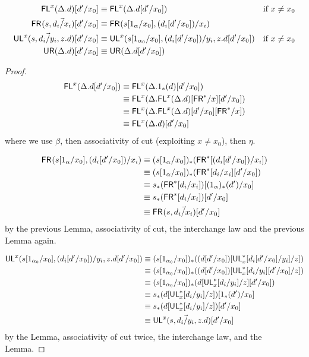 \begin{lemma}
\begin{align*}
\mathsf{FL}^{x}(\Delta.d)[d'/x_0] &\equiv \mathsf{FL}^{x}(\Delta.d[d'/x_0]) & \text{if } x \neq x_0 \\
\mathsf{FR}_{}(s,\vec{d_i/x_i})[d'/x_0] &\equiv \mathsf{FR}_{}(s[1_\alpha/x_0],(d_i[d'/x_0])/x_i) \\
\mathsf{UL}^{x}_{}(s,\vec{d_i/y_i},z.d)[d'/x_0] &\equiv \mathsf{UL}^{x}_{}(s[1_{\alpha_0}/x_0],(d_i[d'/x_0])/y_i,z.d[d'/x_0])  & \text{if } x \neq x_0 \\
\mathsf{UR}(\Delta.d)[d'/x_0] &\equiv \mathsf{UR}(\Delta.d[d'/x_0])
\end{align*}
\end{lemma}
\begin{proof}
\begin{align*}
\mathsf{FL}^{x}(\Delta.d[d'/x_0])
&\equiv \mathsf{FL}^{x}(\Delta.1_*(d)[d'/x_0]) \\
&\equiv \mathsf{FL}^{x}(\Delta.\mathsf{FL}^{x}(\Delta.d)[\mathsf{FR}^*/x][d'/x_0]) \\
&\equiv \mathsf{FL}^{x}(\Delta.\mathsf{FL}^{x}(\Delta.d)[d'/x_0][\mathsf{FR}^*/x]) \\
&\equiv \mathsf{FL}^{x}(\Delta.d)[d'/x_0]
\end{align*}
where we use $\beta$, then associativity of cut (exploiting $x \neq x_0$), then $\eta$.

\begin{align*}
\mathsf{FR}_{}(s[1_\alpha/x_0],(d_i[d'/x_0])/x_i)
&\equiv (s[1_\alpha/x_0])_*(\mathsf{FR}^*[(d_i[d'/x_0])/x_i]) \\
&\equiv (s[1_\alpha/x_0])_*(\mathsf{FR}^*[d_i/x_i][d'/x_0]) \\
&\equiv s_*(\mathsf{FR}^*[d_i/x_i])[(1_\alpha)_*(d')/x_0] \\
&\equiv s_*(\mathsf{FR}^*[d_i/x_i])[d'/x_0] \\
&\equiv \mathsf{FR}_{}(s,\vec{d_i/x_i})[d'/x_0]
\end{align*}
by the previous Lemma, associativity of cut, the interchange law and the previous Lemma again. 

\begin{align*}
\mathsf{UL}^{x}_{}(s[1_{\alpha_0}/x_0],(d_i[d'/x_0])/y_i,z.d[d'/x_0])
&\equiv (s[1_{\alpha_0}/x_0])_*((d[d'/x_0])[\mathsf{UL}^*_{x}[d_i[d'/x_0]/y_i]/z]) \\
&\equiv (s[1_{\alpha_0}/x_0])_*((d[d'/x_0])[\mathsf{UL}^*_{x}[d_i/y_i][d'/x_0]/z]) \\
&\equiv (s[1_{\alpha_0}/x_0])_*(d[\mathsf{UL}^*_{x}[d_i/y_i]/z][d'/x_0]) \\
&\equiv s_*(d[\mathsf{UL}^*_{x}[d_i/y_i]/z])[1_*(d')/x_0] \\
&\equiv s_*(d[\mathsf{UL}^*_{x}[d_i/y_i]/z])[d'/x_0] \\
&\equiv \mathsf{UL}^{x}_{}(s,\vec{d_i/y_i},z.d)[d'/x_0]
\end{align*}
by the Lemma, associativity of cut twice, the interchange law, and the Lemma.


\end{proof}
